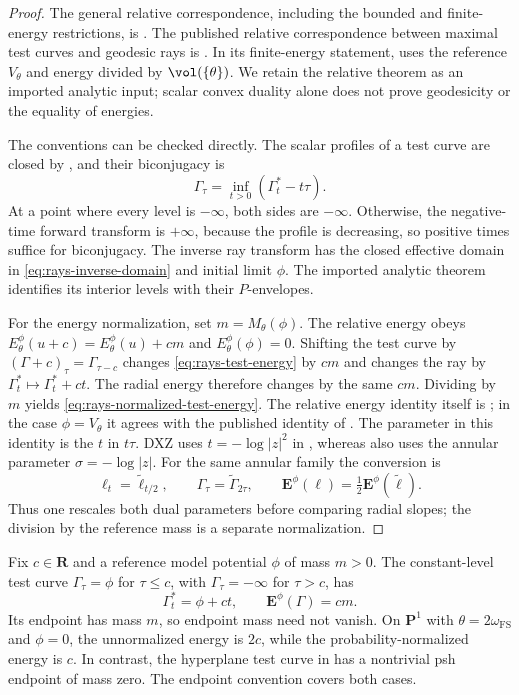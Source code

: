 \begin{proof}
The general relative correspondence, including the bounded and
finite-energy restrictions, is \cite[Theorem~9.2.1]{XiaBook}.
The published relative correspondence between maximal test curves
and geodesic rays is \cite[Theorem~2.6(ii)]{DXZ23}.
In its finite-energy statement, \cite[Theorem~2.6(iii)]{DXZ23}
uses the reference $V_\theta$ and energy divided by
$\vol(\{\theta\})$.
We retain the relative theorem as an imported analytic input;
scalar convex duality alone does not prove geodesicity or
the equality of energies.

The conventions can be checked directly.
The scalar profiles of a test curve are closed by
, and their biconjugacy is
\[
 \Gamma_\tau=\inf_{t>0}(\Gamma_t^*-t\tau).
\tag{52.15}\label{eq:rays-biconjugate}
\]
At a point where every level is $-\infty$, both sides are
$-\infty$.  Otherwise, the negative-time forward transform
is $+\infty$, because the profile is decreasing, so positive
times suffice for biconjugacy.
The inverse ray transform has the closed effective domain
in \eqref{eq:rays-inverse-domain} and initial limit $\phi$.
The imported analytic theorem identifies its interior levels
with their $P$-envelopes.

For the energy normalization, set $m=M_\theta(\phi)$.
The relative energy obeys
$E_\theta^\phi(u+c)=E_\theta^\phi(u)+cm$ and
$E_\theta^\phi(\phi)=0$.
Shifting the test curve by $(\Gamma+c)_\tau=\Gamma_{\tau-c}$
changes \eqref{eq:rays-test-energy} by $cm$ and changes the ray
by $\Gamma_t^*\mapsto\Gamma_t^*+ct$.
The radial energy therefore changes by the same $cm$.
Dividing by $m$ yields \eqref{eq:rays-normalized-test-energy}.
The relative energy identity itself is
\cite[equation~(9.21)]{XiaBook}; in the case $\phi=V_\theta$ it
agrees with the published identity of \cite[Theorem~2.6(iii)]{DXZ23}.
The parameter in this identity is the $t$ in $t\tau$.
DXZ uses $t=-\log|z|^2$ in \cite[equations~(6), (10)]{DXZ23},
whereas \cite[Section~4.1]{XiaBook} also uses the annular parameter
$\sigma=-\log|z|$.  For the same annular family the conversion is
\[
 \ell_t=\widetilde\ell_{t/2},\qquad
 \Gamma_\tau=\widetilde\Gamma_{2\tau},\qquad
 \mathbf E^\phi(\ell)=\tfrac12\mathbf E^\phi(\widetilde\ell).
\]
Thus one rescales both dual parameters before comparing radial slopes;
the division by the reference mass is a separate normalization.
\end{proof}

\begin{example}\label{ex:rays-constant-slope-mass}
Fix $c\in\mathbf R$ and a reference model potential $\phi$ of
mass $m>0$.  The constant-level test curve
$\Gamma_\tau=\phi$ for $\tau\leq c$, with
$\Gamma_\tau=-\infty$ for $\tau>c$, has
\[
              \Gamma_t^*=\phi+ct,\qquad
              \mathbf E^\phi(\Gamma)=cm.
\]
Its endpoint has mass $m$, so endpoint mass need not vanish.
On $\mathbf P^1$ with $\theta=2\omega_{\mathrm{FS}}$ and
$\phi=0$, the unnormalized energy is $2c$, while the
probability-normalized energy is $c$.
In contrast, the hyperplane test curve in
 has a nontrivial psh endpoint
of mass zero.  The endpoint convention covers both cases.
\end{example}


